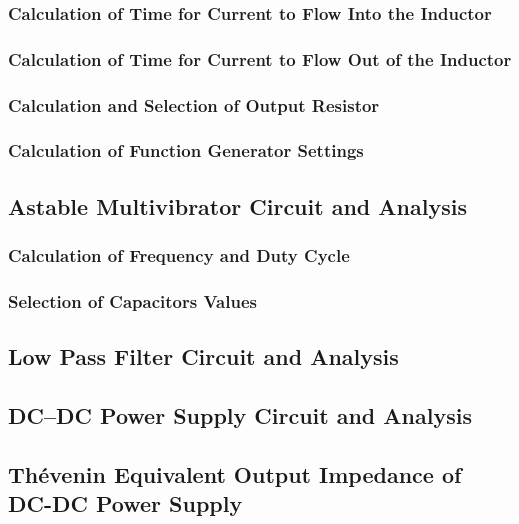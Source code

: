 \documentclass[11pt]{article}
\begin{document}
\subsubsection{Calculation of Time for Current to Flow Into the Inductor}

\subsubsection{Calculation of Time for Current to Flow Out of the Inductor}

\subsubsection{Calculation and Selection of Output Resistor}

\subsubsection{Calculation of Function Generator Settings}


\subsection{Astable Multivibrator Circuit and Analysis}

\subsubsection{Calculation of Frequency and Duty Cycle}

\subsubsection{Selection of Capacitors Values}

\subsection{Low Pass Filter Circuit and Analysis}

\subsection{DC--DC Power Supply Circuit and Analysis}

\subsection{Th\'evenin Equivalent Output Impedance of DC-DC Power Supply}
\end{document}
